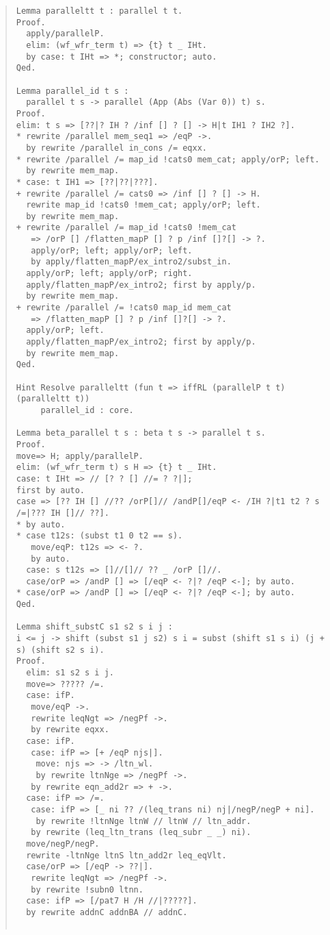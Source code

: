 \documentclass[12pt, titlepage]{ltjsarticle}
\begin{document}
\begin{quote}
\begin{verbatim}
Lemma paralleltt t : parallel t t.
Proof.
  apply/parallelP.
  elim: (wf_wfr_term t) => {t} t _ IHt.
  by case: t IHt => *; constructor; auto.
Qed.

Lemma parallel_id t s :
  parallel t s -> parallel (App (Abs (Var 0)) t) s.
Proof.
elim: t s => [??|? IH ? /inf [] ? [] -> H|t IH1 ? IH2 ?].
* rewrite /parallel mem_seq1 => /eqP ->.
  by rewrite /parallel in_cons /= eqxx.
* rewrite /parallel /= map_id !cats0 mem_cat; apply/orP; left.
  by rewrite mem_map.
* case: t IH1 => [??|??|???].
+ rewrite /parallel /= cats0 => /inf [] ? [] -> H.
  rewrite map_id !cats0 !mem_cat; apply/orP; left.
  by rewrite mem_map.
+ rewrite /parallel /= map_id !cats0 !mem_cat
   => /orP [] /flatten_mapP [] ? p /inf []?[] -> ?.
   apply/orP; left; apply/orP; left.
   by apply/flatten_mapP/ex_intro2/subst_in.
  apply/orP; left; apply/orP; right.
  apply/flatten_mapP/ex_intro2; first by apply/p.
  by rewrite mem_map.
+ rewrite /parallel /= !cats0 map_id mem_cat
   => /flatten_mapP [] ? p /inf []?[] -> ?.
  apply/orP; left.
  apply/flatten_mapP/ex_intro2; first by apply/p.
  by rewrite mem_map.
Qed.

Hint Resolve paralleltt (fun t => iffRL (parallelP t t) (paralleltt t))
     parallel_id : core.

Lemma beta_parallel t s : beta t s -> parallel t s.
Proof.
move=> H; apply/parallelP.
elim: (wf_wfr_term t) s H => {t} t _ IHt.
case: t IHt => // [? ? [] //= ? ?|];
first by auto.
case => [?? IH [] //?? /orP[]// /andP[]/eqP <- /IH ?|t1 t2 ? s /=|??? IH []// ??].
* by auto.
* case t12s: (subst t1 0 t2 == s).
   move/eqP: t12s => <- ?.
   by auto.
  case: s t12s => []//[]// ?? _ /orP []//.
  case/orP => /andP [] => [/eqP <- ?|? /eqP <-]; by auto.
* case/orP => /andP [] => [/eqP <- ?|? /eqP <-]; by auto.
Qed.

Lemma shift_substC s1 s2 s i j :
i <= j -> shift (subst s1 j s2) s i = subst (shift s1 s i) (j + s) (shift s2 s i).
Proof.
  elim: s1 s2 s i j.
  move=> ????? /=.
  case: ifP.
   move/eqP ->.
   rewrite leqNgt => /negPf ->.
   by rewrite eqxx.
  case: ifP.
   case: ifP => [+ /eqP njs|].
    move: njs => -> /ltn_wl.
    by rewrite ltnNge => /negPf ->.
   by rewrite eqn_add2r => + ->.
  case: ifP => /=.
   case: ifP => [_ ni ?? /(leq_trans ni) nj|/negP/negP + ni].
    by rewrite !ltnNge ltnW // ltnW // ltn_addr.
   by rewrite (leq_ltn_trans (leq_subr _ _) ni).
  move/negP/negP.
  rewrite -ltnNge ltnS ltn_add2r leq_eqVlt.
  case/orP => [/eqP -> ??|].
   rewrite leqNgt => /negPf ->.
   by rewrite !subn0 ltnn.
  case: ifP => [/pat7 H /H //|?????].
  by rewrite addnC addnBA // addnC.


\end{verbatim}
\end{quote}
\end{document}
